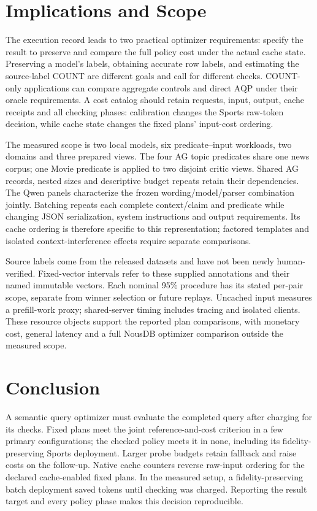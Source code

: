 \section{Implications and Scope}
The execution record leads to two practical optimizer requirements: specify the result to preserve and compare the full policy cost under the actual cache state. Preserving a model's labels, obtaining accurate row labels, and estimating the source-label COUNT are different goals and call for different checks. COUNT-only applications can compare aggregate controls and direct AQP under their oracle requirements. A cost catalog should retain requests, input, output, cache receipts and all checking phases: calibration changes the Sports raw-token decision, while cache state changes the fixed plans' input-cost ordering.

The measured scope is two local models, six predicate--input workloads, two domains and three prepared views. The four AG topic predicates share one news corpus; one Movie predicate is applied to two disjoint critic views. Shared AG records, nested sizes and descriptive budget repeats retain their dependencies. The Qwen panels characterize the frozen wording/model/parser combination jointly. Batching repeats each complete context/claim and predicate while changing JSON serialization, system instructions and output requirements. Its cache ordering is therefore specific to this representation; factored templates and isolated context-interference effects require separate comparisons.

Source labels come from the released datasets and have not been newly human-verified. Fixed-vector intervals refer to these supplied annotations and their named immutable vectors. Each nominal 95\% procedure has its stated per-pair scope, separate from winner selection or future replays. Uncached input measures a prefill-work proxy; shared-server timing includes tracing and isolated clients. These resource objects support the reported plan comparisons, with monetary cost, general latency and a full NousDB optimizer comparison outside the measured scope.

\section{Conclusion}
A semantic query optimizer must evaluate the completed query after charging for its checks. Fixed plans meet the joint reference-and-cost criterion in a few primary configurations; the checked policy meets it in none, including its fidelity-preserving Sports deployment. Larger probe budgets retain fallback and raise costs on the follow-up. Native cache counters reverse raw-input ordering for the declared cache-enabled fixed plans. In the measured setup, a fidelity-preserving batch deployment saved tokens until checking was charged. Reporting the result target and every policy phase makes this decision reproducible.
